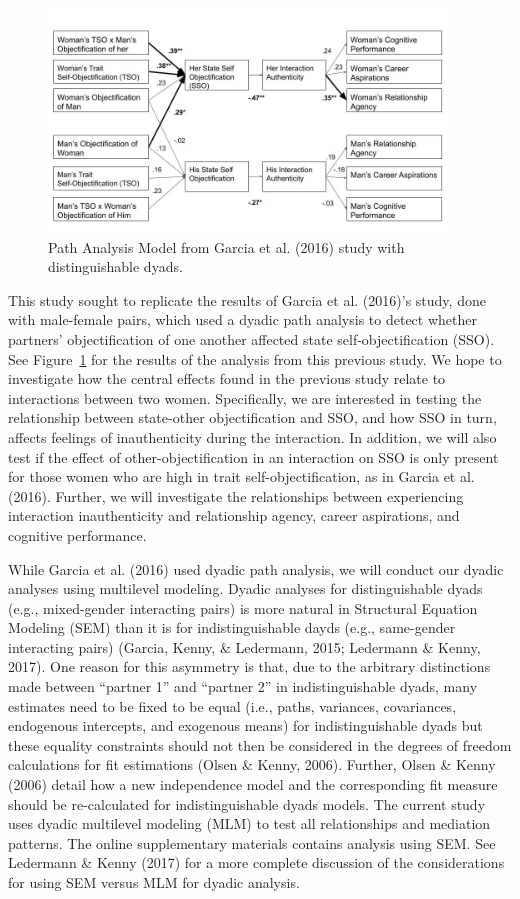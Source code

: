 \documentclass[
  man]{apa6}
\begin{document}
\begin{figure}
\includegraphics[width=400px]{2016_figure} \caption{Path Analysis Model from Garcia et al. (2016) study with distinguishable dyads.}\label{fig:2016figure}
\end{figure}

This study sought to replicate the results of Garcia et al. (2016)'s study, done with male-female pairs, which used a dyadic path analysis to detect whether partners' objectification of one another affected state self-objectification (SSO). See Figure~\ref{fig:2016figure} for the results of the analysis from this previous study. We hope to investigate how the central effects found in the previous study relate to interactions between two women. Specifically, we are interested in testing the relationship between state-other objectification and SSO, and how SSO in turn, affects feelings of inauthenticity during the interaction. In addition, we will also test if the effect of other-objectification in an interaction on SSO is only present for those women who are high in trait self-objectification, as in Garcia et al. (2016). Further, we will investigate the relationships between experiencing interaction inauthenticity and relationship agency, career aspirations, and cognitive performance.

While Garcia et al. (2016) used dyadic path analysis, we will conduct our dyadic analyses using multilevel modeling. Dyadic analyses for distinguishable dyads (e.g., mixed-gender interacting pairs) is more natural in Structural Equation Modeling (SEM) than it is for indistinguishable dayds (e.g., same-gender interacting pairs) (Garcia, Kenny, \& Ledermann, 2015; Ledermann \& Kenny, 2017). One reason for this asymmetry is that, due to the arbitrary distinctions made between \enquote{partner 1} and \enquote{partner 2} in indistinguishable dyads, many estimates need to be fixed to be equal (i.e., paths, variances, covariances, endogenous intercepts, and exogenous means) for indistinguishable dyads but these equality constraints should not then be considered in the degrees of freedom calculations for fit estimations (Olsen \& Kenny, 2006). Further, Olsen \& Kenny (2006) detail how a new independence model and the corresponding fit measure should be re-calculated for indistinguishable dyads models. The current study uses dyadic multilevel modeling (MLM) to test all relationships and mediation patterns. The online supplementary materials contains analysis using SEM. See Ledermann \& Kenny (2017) for a more complete discussion of the considerations for using SEM versus MLM for dyadic analysis.
\end{document}
